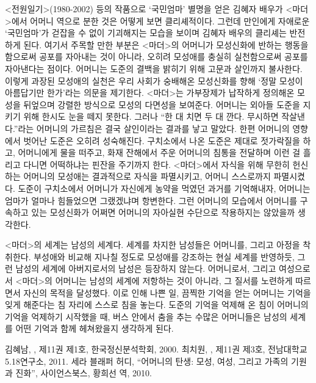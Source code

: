 <전원일기>(1980-2002) 등의 작품으로 `국민엄마' 별명을 얻은 김혜자 배우가 <마더>에서 어머니 역으로 분한 것은 어떻게 보면 클리셰적이다. 그런데 만인에게 자애로운 `국민엄마'가 걷잡을 수 없이 기괴해지는 모습을 보이며 김혜자 배우의 클리셰는 반전하게 된다. 여기서 주목할 만한 부분은 <마더>의 어머니가 모성신화에 반하는 행동을 함으로써 공포를 자아내는 것이 아니라, 오히려 모성애를 충실히 실천함으로써 공포를 자아낸다는 점이다. 어머니는 도준의 결백을 밝히기 위해 고문과 살인까지 불사한다. 이렇게 과장된 모성애의 실천은 우리 사회가 숭배해온 모성신화를 향해 `정말 모성이 아름답기만 한가'라는 의문을 제기한다. <마더>는 가부장제가 납작하게 정의해온 모성을 뒤엎으며 강렬한 방식으로 모성의 다면성을 보여준다. 어머니는 외아들 도준을 지키기 위해 한시도 눈을 떼지 못한다. 그러나 ``한 대 치면 두 대 깐다. 무시하면 작살낸다.''라는 어머니의 가르침은 결국 살인이라는 결과를 낳고 말았다. 한편 어머니의 영향에서 벗어난 도준은 오히려 성숙해진다. 구치소에서 나온 도준은 제대로 젓가락질을 하고, 어머니에게 물을 떠주고, 화재 잔해에서 주운 어머니의 침통을 전달하며 이런 걸 흘리고 다니면 어떡하냐는 핀잔을 주기까지 한다. <마더>에서 자식을 위해 무한히 헌신하는 어머니의 모성애는 결과적으로 자식을 파멸시키고, 어머니 스스로까지 파멸시켰다. 도준이 구치소에서 어머니가 자신에게 농약을 먹였던 과거를 기억해내자, 어머니는 엄마가 얼마나 힘들었으면 그랬겠냐며 항변한다. 그런 어머니의 모습에서 어머니를 구속하고 있는 모성신화가 어쩌면 어머니의 자아실현 수단으로 작용하지는 않았을까 생각한다.

<마더>의 세계는 남성의 세계다. 세계를 차지한 남성들은 어머니를, 그리고 아정을 착취한다. 부성애와 비교해 지나칠 정도로 모성애를 강조하는 현실 세계를 반영하듯, 그런 남성의 세계에 아버지로서의 남성은 등장하지 않는다. 어머니로서, 그리고 여성으로서 <마더>의 어머니는 남성의 세계에 저항하는 것이 아니라, 그 질서를 노련하게 따르면서 자신의 목적을 달성했다. 이로 인해 나쁜 일, 끔찍한 기억을 얻는 어머니는 기억을 잊게 해준다는 침 자리에 스스로 침을 놓는다. 도준의 기억을 억제해 온 침이 어머니의 기억을 억제하기 시작했을 때, 버스 안에서 춤을 추는 수많은 어머니들은 남성의 세계를 어떤 기억과 함께 헤쳐왔을지 생각하게 된다.

\begin{thebibliography}{9}
   김혜남, ,  제11권 제1호, 한국정신분석학회, 2000.
   최치원, ,  제11권 제3호, 전남대학교 5.18연구소, 2011.
   세라 블래퍼 허디, ``어머니의 탄생: 모성, 여성, 그리고 가족의 기원과 진화'', 사이언스북스, 황희선 역, 2010.
\end{thebibliography}
